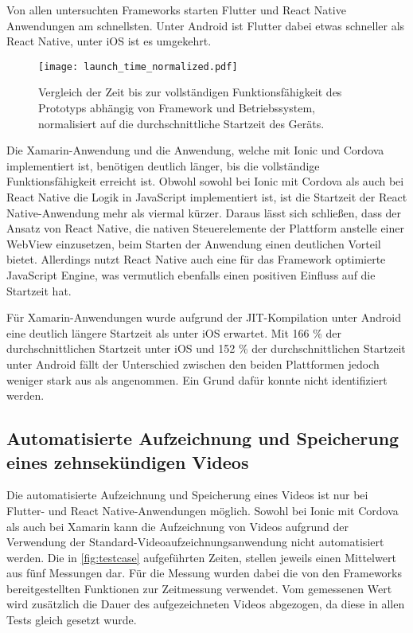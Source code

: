 Von allen untersuchten Frameworks starten Flutter und React Native Anwendungen am schnellsten.
Unter Android ist Flutter dabei etwas schneller als React Native, unter iOS ist es umgekehrt.

\begin{figure}[ht]
  \centering 
  \texttt{[image: launch\_time\_normalized.pdf]}
  \caption{Vergleich der Zeit bis zur vollständigen Funktionsfähigkeit des Prototyps abhängig von Framework und Betriebssystem, normalisiert auf die durchschnittliche Startzeit des Geräts.}
  \label{fig:launch_time_normalized}
\end{figure}
Die Xamarin-Anwendung und die Anwendung, welche mit Ionic und Cordova implementiert ist, benötigen deutlich länger, bis die vollständige Funktionsfähigkeit erreicht ist.
Obwohl sowohl bei Ionic mit Cordova als auch bei React Native die Logik in JavaScript implementiert ist, ist die Startzeit der React Native-Anwendung mehr als viermal kürzer.
Daraus lässt sich schließen, dass der Ansatz von React Native, die nativen Steuerelemente der Plattform anstelle einer WebView einzusetzen, beim Starten der Anwendung einen deutlichen Vorteil bietet.
Allerdings nutzt React Native auch eine für das Framework optimierte JavaScript Engine, was vermutlich ebenfalls einen positiven Einfluss auf die Startzeit hat.

Für Xamarin-Anwendungen wurde aufgrund der \ac{JIT}-Kompilation unter Android eine deutlich längere Startzeit als unter iOS erwartet.
Mit 166 \% der durchschnittlichen Startzeit unter iOS und 152 \% der durchschnittlichen Startzeit unter Android fällt der Unterschied zwischen den beiden Plattformen jedoch weniger stark aus als angenommen.
Ein Grund dafür konnte nicht identifiziert werden.

\subsection{Automatisierte Aufzeichnung und Speicherung eines zehnsekündigen Videos}

Die automatisierte Aufzeichnung und Speicherung eines Videos ist nur bei Flutter- und React Native-Anwendungen möglich.
Sowohl bei Ionic mit Cordova als auch bei Xamarin kann die Aufzeichnung von Videos aufgrund der Verwendung der Standard-Videoaufzeichnungsanwendung nicht automatisiert werden.
Die in \autoref{fig:testcase} aufgeführten Zeiten, stellen jeweils einen Mittelwert aus fünf Messungen dar.
Für die Messung wurden dabei die von den Frameworks bereitgestellten Funktionen zur Zeitmessung verwendet.
Vom gemessenen Wert wird zusätzlich die Dauer des aufgezeichneten Videos abgezogen, da diese in allen Tests gleich gesetzt wurde.

